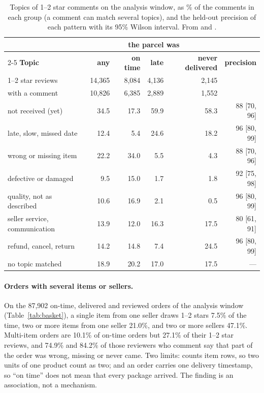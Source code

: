 \begin{table}[htbp]
\centering
\caption{Topics of 1--2 star comments on the analysis window, as \% of the
comments in each group (a comment can match several topics), and the held-out
precision of each pattern with its 95\% Wilson interval. From
 and .}
\label{tab:topics}
\footnotesize
\setlength{\tabcolsep}{4pt}
\begin{tabular}{@{}lrrrrr@{}}
\toprule
 & \multicolumn{4}{c}{\textbf{the parcel was}} & \\
\cmidrule(lr){2-5}
\textbf{Topic} & \textbf{any} & \textbf{on time} & \textbf{late} & \textbf{never delivered} & \textbf{precision} \\
\midrule
1--2 star reviews & 14{,}365 & 8{,}084 & 4{,}136 & 2{,}145 & \\
\quad with a comment & 10{,}826 & 6{,}385 & 2{,}889 & 1{,}552 & \\
\midrule
not received (yet) & 34.5 & 17.3 & 59.9 & 58.3 & 88 [70, 96] \\
late, slow, missed date & 12.4 & 5.4 & 24.6 & 18.2 & 96 [80, 99] \\
wrong or missing item & 22.2 & 34.0 & 5.5 & 4.3 & 88 [70, 96] \\
defective or damaged & 9.5 & 15.0 & 1.7 & 1.8 & 92 [75, 98] \\
quality, not as described & 10.6 & 16.9 & 2.1 & 0.5 & 96 [80, 99] \\
seller service, communication & 13.9 & 12.0 & 16.3 & 17.5 & 80 [61, 91] \\
refund, cancel, return & 14.2 & 14.8 & 7.4 & 24.5 & 96 [80, 99] \\
no topic matched & 18.9 & 20.2 & 17.0 & 17.5 & --- \\
\bottomrule
\end{tabular}
\end{table}

\paragraph{Orders with several items or sellers.} On the 87{,}902 on-time,
delivered and reviewed orders of the analysis window (Table~\ref{tab:basket}), a
single item from one seller draws 1--2 stars 7.5\% of the time, two or more items
from one seller 21.0\%, and two or more sellers 47.1\%. Multi-item orders are
10.1\% of on-time orders but 27.1\% of their 1--2 star reviews, and 74.9\% and
84.2\% of those reviewers who comment say that part of the order was wrong,
missing or never came. Two limits:  counts item rows, so two units
of one product count as two; and an order carries one delivery timestamp, so
``on time'' does not mean that every package arrived. The finding is an
association, not a mechanism.

